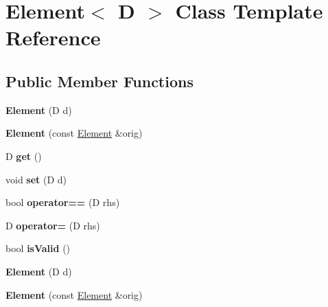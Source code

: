 \hypertarget{class_element}{}\section{Element$<$ D $>$ Class Template Reference}
\label{class_element}
\subsection*{Public Member Functions}
\begin{DoxyCompactItemize}
\item 
\mbox{\label{class_element_a4dff9b63467ee6287327b255396f0988}} 
{\bfseries Element} (D d)
\item 
\mbox{\label{class_element_a2a953047eeec5513b8942a02570f7ced}} 
{\bfseries Element} (const \hyperlink{class_element}{Element} \&orig)
\item 
\mbox{\label{class_element_a346f8fee69720a230e3374c844d18f3e}} 
D {\bfseries get} ()
\item 
\mbox{\label{class_element_a5327720f91a6006429b6b3a2eec46aaa}} 
void {\bfseries set} (D d)
\item 
\mbox{\label{class_element_a26ca0bf7130ed93df363576b9666ceeb}} 
bool {\bfseries operator==} (D rhs)
\item 
\mbox{\label{class_element_a18998203e5826498188b22b859927839}} 
D {\bfseries operator=} (D rhs)
\item 
\mbox{\label{class_element_a6f2ef9738bbc11107dc0e40366197189}} 
bool {\bfseries is\+Valid} ()
\item 
\mbox{\label{class_element_a4dff9b63467ee6287327b255396f0988}} 
{\bfseries Element} (D d)
\item 
\mbox{\label{class_element_a2a953047eeec5513b8942a02570f7ced}} 
{\bfseries Element} (const \hyperlink{class_element}{Element} \&orig)
\item 
\mbox{\label{class_element_a346f8fee69720a230e3374c844d18f3e}} 

\end{DoxyCompactItemize}
